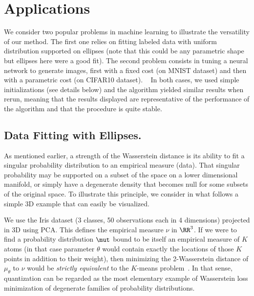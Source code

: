 
\section{Applications}

We consider two popular problems in machine learning to illustrate the versatility of our method. The first one relies on fitting labeled data with uniform distribution supported on ellipses (note that this could be any parametric shape but ellipses here were a good fit). The second problem consists in tuning a neural network to generate images, first with a fixed cost (on MNIST dataset) and then with a parametric cost (on CIFAR10 dataset). \
%
In both cases, we used simple initializations (see details below) and the algorithm yielded similar results when rerun, meaning that the results displayed are representative of the performance of the algorithm and that the procedure is quite stable.

\subsection{Data Fitting with Ellipses.}

As mentioned earlier, a strength of the Wasserstein distance is its ability to fit a singular probability distribution to an empirical measure (data). That singular probability may be supported on a subset of the space on a lower dimensional manifold, or simply have a degenerate density that becomes null for some subsets of the original space. To illustrate this principle, we consider in what follows a simple 3D example that can easily be visualized.

We use the Iris dataset (3 classes, 50 observations each in 4 dimensions) projected in 3D using PCA. This defines the empirical measure $\nu$ in $\RR^3$. 
%
If we were to find a probability distribution $\mut$ bound to be itself an empirical measure of $K$ atoms (in that case parameter $\theta$ would contain exactly the locations of those $K$ points in addition to their weight), then minimizing the 2-Wasserstein distance of $\mu_\theta$ to $\nu$ would be \emph{strictly equivalent} to the $K$-means problem~\cite{NIPS2012_4651}. In that sense, quantization can be regarded as the most elementary example of Wasserstein loss minimization of degenerate families of probability distributions.

